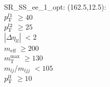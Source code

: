 SR\_SS\_ee\_1\_opt: (162.5,12.5): \\
$p_{\text{T}}^{l1}$ $\geq 40$ \\
$p_{\text{T}}^{l2}$ $\geq 25$ \\
$|\Delta\eta_{ll}|$ $<2$ \\
$m_{\text{eff}}$ $\geq 200$ \\
$m_{\text{T}}^{\text{max}}$ $\geq 130$ \\
$m_{lj}$/$m_{ljj}$ $<105$ \\
$p_{\text{T}}^{ll}$ $\geq 10$ \\
